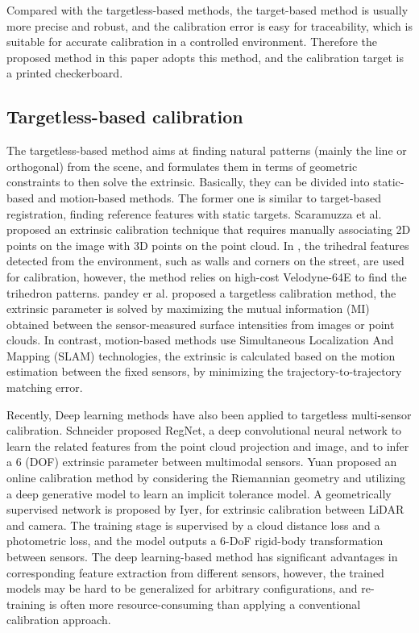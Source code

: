 \documentclass[journal]{vgtc}
\begin{document}
Compared with the targetless-based methods, the target-based method is usually more precise and robust, and the calibration error is easy for traceability, which is suitable for accurate calibration in a controlled environment. Therefore the proposed method in this paper adopts this method, and the calibration target is a printed checkerboard. 


\subsection{Targetless-based calibration}
The targetless-based method aims at finding natural patterns (mainly the line or orthogonal) from the scene, and formulates them in terms of geometric constraints to then solve the extrinsic. Basically, they can be divided into static-based and motion-based methods. The former one is similar to target-based registration, finding reference features with static targets. Scaramuzza et al.\cite{scaramuzza2007extrinsic} proposed an extrinsic calibration technique that requires manually associating 2D points on the image with 3D points on the point cloud. In \cite{gong20133d}, the trihedral features detected from the environment, such as walls and corners on the street, are used for calibration, however, the method relies on high-cost Velodyne-64E to find the trihedron patterns. pandey er al.\cite{pandey2015automatic} proposed a targetless calibration method, the extrinsic parameter is solved by maximizing the mutual information (MI) obtained between the sensor-measured surface intensities from images or point clouds. In contrast, motion-based methods\cite{fu2019lidar} use Simultaneous Localization And Mapping (SLAM) technologies, the extrinsic is calculated based on the motion estimation between the fixed sensors, by minimizing the trajectory-to-trajectory matching error. 

Recently, Deep learning methods have also been applied to targetless multi-sensor calibration. Schneider \cite{schneider2017regnet} proposed RegNet, a deep convolutional neural network to learn the related features from the point cloud projection and image, and to infer a 6 (DOF) extrinsic parameter between multimodal sensors. Yuan \cite{yuan2020rggnet} proposed an online calibration method by considering the Riemannian geometry and utilizing a deep generative model to learn an implicit tolerance model. A  geometrically supervised network is proposed \cite{iyer2018calibnet} by Iyer, for extrinsic calibration between LiDAR and camera. The training stage is supervised by a cloud distance loss and a photometric loss, and the model outputs a 6-DoF rigid-body transformation between sensors. The deep learning-based method has significant advantages in corresponding feature extraction from different sensors, however, the trained models may be hard to be generalized for arbitrary configurations, and re-training is often more resource-consuming than applying a conventional calibration approach.
\end{document}
